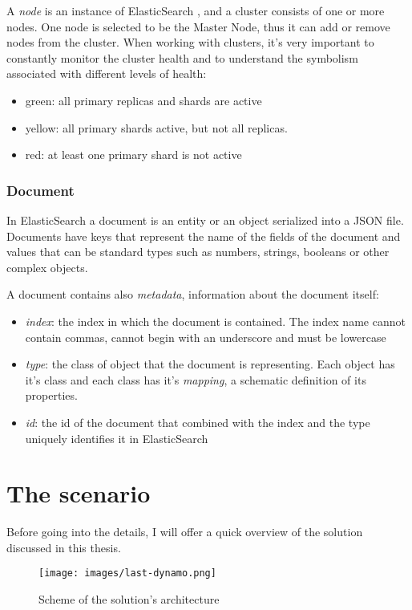 A \textit{node} is an instance of ElasticSearch , and a cluster consists of one or more nodes.
One node is selected to be the Master Node, thus it can add or remove nodes from the cluster.
When working with clusters, it's very important to constantly monitor the cluster health and to understand
the symbolism associated with different levels of health:
\begin{itemize}
  \item green: all primary replicas and shards are active
  \item yellow: all primary shards active, but not all replicas.
  \item red: at least one primary shard is not active
\end{itemize}

\subsubsection{Document}
In ElasticSearch a document is an entity or an object serialized into a JSON file.
Documents have keys that represent the name of the fields of the document and values
that can be standard types such as numbers, strings, booleans or other complex objects.

A document contains also \textit{metadata}, information about the document itself:
\begin{itemize}
  \item \textit{index}: the index in which the document is contained. The index name cannot contain commas, cannot begin with an underscore and must be lowercase
  \item \textit{type}: the class of object that the document is representing. Each object has it's class and each class has it's \textit{mapping}, a schematic definition of  its properties.
  \item \textit{id}: the id of the document that combined with the index and the type uniquely identifies it in ElasticSearch
\end{itemize}

\section{The scenario}
\label{ch:scenario}
Before going into the details, I will offer a quick overview of the solution discussed in this thesis.
\begin{figure}[h]
  \centering
  \texttt{[image: images/last-dynamo.png]}
  \caption{Scheme of the solution's architecture}
  \label{fig:architecture}
\end{figure}


